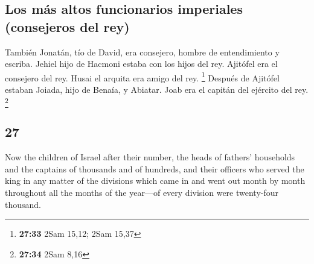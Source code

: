 \begin{paracol}{2}
\hypertarget{los-muxe1s-altos-funcionarios-imperiales-consejeros-del-rey}{%
\subsection{Los más altos funcionarios imperiales (consejeros del
rey)}\label{los-muxe1s-altos-funcionarios-imperiales-consejeros-del-rey}}

 También Jonatán, tío de David, era consejero, hombre de
entendimiento y escriba. Jehiel hijo de Hacmoni estaba con los hijos del
rey.  Ajitófel era el consejero del rey. Husai el arquita
era amigo del rey. \footnote{\textbf{27:33} 2Sam 15,12; 2Sam 15,37}
 Después de Ajitófel estaban Joiada, hijo de Benaía, y
Abiatar. Joab era el capitán del ejército del rey. \footnote{\textbf{27:34}
  2Sam 8,16}

\switchcolumn
\begin{otherlanguage}{english}

\hypertarget{section-53}{%
\section{27}\label{section-53}}

 Now the children of Israel after their number, the heads
of fathers' households and the captains of thousands and of hundreds,
and their officers who served the king in any matter of the divisions
which came in and went out month by month throughout all the months of
the year---of every division were twenty-four thousand.


\end{otherlanguage}
\end{paracol}
